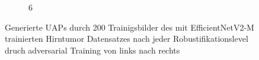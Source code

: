 \begin{figure}[ht!]
\begin{subfigure}{0.095\linewidth}
        \caption{6}
    \end{subfigure}
    \caption{Generierte UAPs durch 200 Trainigsbilder des mit EfficientNetV2-M trainierten Hirntumor Datensatzes nach jeder Robustifikationslevel druch adversarial Training von links nach rechts}
    \label{fig:uap-resnet18-covidx-rob0}
\end{figure}



